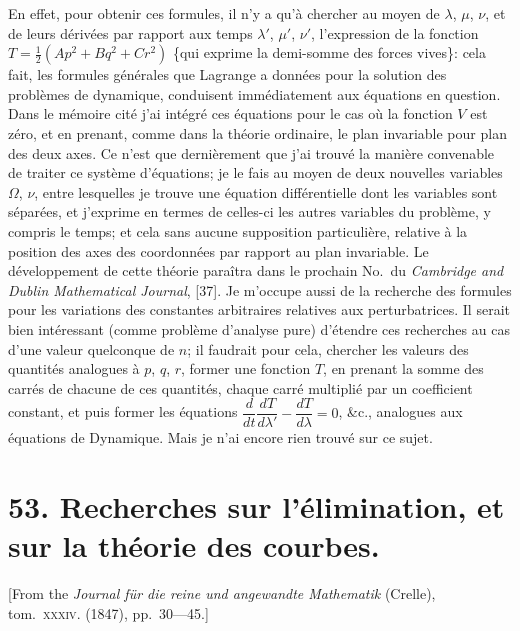 \documentclass[12pt,a4paper]{article}
\theoremstyle{plain}
\begin{document}
En effet, pour obtenir ces formules, il n'y a qu'\`a chercher au moyen de $\lambda$, $\mu$, $\nu$, et de leurs d\'eriv\'ees par rapport aux temps $\lambda'$, $\mu'$, $\nu'$, l'expression de la fonction $T = \tfrac{1}{2}(Ap^2 + Bq^2 + Cr^2)$ \{qui exprime la demi-somme des forces vives\}: cela fait, les formules g\'en\'erales que Lagrange a donn\'ees pour la solution des probl\`emes de dynamique, conduisent imm\'ediatement aux \'equations en question. Dans le m\'emoire cit\'e j'ai int\'egr\'e ces \'equations pour le cas o\`u la fonction $V$ est z\'ero, et en prenant, comme dans la th\'eorie ordinaire, le plan invariable pour plan des deux axes. Ce n'est que derni\`erement que j'ai trouv\'e la mani\`ere convenable de traiter ce syst\`eme d'\'equations; je le fais au moyen de deux nouvelles variables $\Omega$, $\nu$, entre lesquelles je trouve une \'equation diff\'erentielle dont les variables sont s\'epar\'ees, et j'exprime en termes de celles-ci les autres variables du probl\`eme, y compris le temps; et cela sans aucune supposition particuli\`ere, relative \`a la position des axes des coordonn\'ees par rapport au plan invariable. Le d\'eveloppement de cette th\'eorie para\^itra dans le prochain No.\ du \textit{Cambridge and Dublin Mathematical Journal}, [37]. Je m'occupe aussi de la recherche des formules pour les variations des constantes arbitraires relatives aux perturbatrices. Il serait bien int\'eressant (comme probl\`eme d'analyse pure) d'\'etendre ces recherches au cas d'une valeur quelconque de $n$; il faudrait pour cela, chercher les valeurs des quantit\'es analogues \`a $p$, $q$, $r$, former une fonction $T$, en prenant la somme des carr\'es de chacune de ces quantit\'es, chaque carr\'e multipli\'e par un coefficient constant, et puis former les \'equations $\dfrac{d}{dt} \dfrac{dT}{d\lambda'} - \dfrac{dT}{d\lambda} = 0$, \&c., analogues aux \'equations de Dynamique. Mais je n'ai encore rien trouv\'e sur ce sujet.

\newpage


\section*{53. Recherches sur l'\'elimination, et sur la th\'eorie des courbes.}

[From the \textit{Journal f\"ur die reine und angewandte Mathematik} (Crelle), tom.~\textsc{xxxiv}. (1847), pp.~30---45.]

\bigskip
\end{document}
